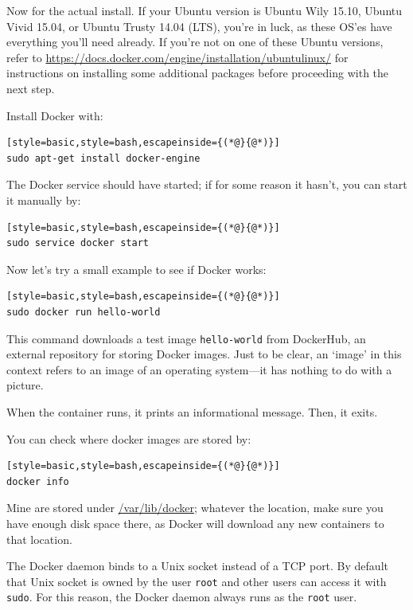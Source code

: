 \documentclass[12pt, a4paper, twoside,openany,titlepage]{article}
\begin{document}
{Now for the actual install. If your Ubuntu version is Ubuntu Wily 15.10, Ubuntu Vivid 15.04, or Ubuntu Trusty 14.04 (LTS), you're in luck, as these OS'es have everything you'll need already. If you're not on one of these Ubuntu versions, refer to \url{https://docs.docker.com/engine/installation/ubuntulinux/} for instructions on installing some additional packages before proceeding with the next step.

Install Docker with:
\begin{lstlisting}[style=basic,style=bash,escapeinside={(*@}{@*)}]
sudo apt-get install docker-engine
\end{lstlisting}

The Docker service should have started; if for some reason it hasn't, you can start it manually by:
\begin{lstlisting}[style=basic,style=bash,escapeinside={(*@}{@*)}]
sudo service docker start
\end{lstlisting}

Now let's try a small example to see if Docker works:
\begin{lstlisting}[style=basic,style=bash,escapeinside={(*@}{@*)}]
sudo docker run hello-world
\end{lstlisting}

This command downloads a test image \texttt{hello-world} from DockerHub, an external repository for storing Docker images. Just to be clear, an `image' in this context refers to an image of an operating system---it has nothing to do with a picture.

When the container runs, it prints an informational message. Then, it exits.

You can check where docker images are stored by:
\begin{lstlisting}[style=basic,style=bash,escapeinside={(*@}{@*)}]
docker info
\end{lstlisting}
Mine are stored under \url{/var/lib/docker}; whatever the location, make sure you have enough disk space there, as Docker will download any new containers to that location.

The Docker daemon binds to a Unix socket instead of a TCP port. By default that Unix socket is owned by the user \texttt{root} and other users can access it with \texttt{sudo}. For this reason, the Docker daemon always runs as the \texttt{root} user.

}
\end{document}
